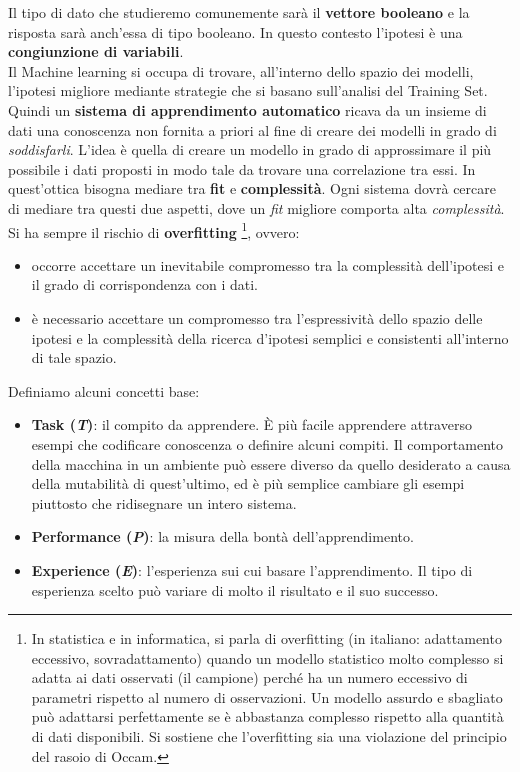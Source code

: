 Il tipo di dato che studieremo comunemente sarà il \textbf{vettore booleano} e la risposta sarà anch'essa di tipo booleano. In questo contesto l'ipotesi è una \textbf{congiunzione di variabili}.\\
Il Machine learning si occupa di trovare, all'interno dello spazio dei modelli, l'ipotesi migliore mediante strategie che si basano sull'analisi del Training Set.
Quindi un \textbf{sistema di apprendimento automatico} ricava da un insieme di dati
una conoscenza non fornita a priori al fine di creare dei modelli in grado di \textit{soddisfarli}. 
L'idea è quella di creare un modello in grado di approssimare il più possibile i dati proposti 
in modo tale da trovare una correlazione tra essi. In
quest'ottica bisogna mediare tra \textbf{fit} e \textbf{complessità}. Ogni
sistema dovrà cercare di mediare tra questi due aspetti, dove un \textit{fit}
migliore comporta alta \textit{complessità}. Si ha sempre il rischio di \textbf{overfitting} 
\footnote{In statistica e in informatica, si parla di overfitting (in italiano: adattamento eccessivo, sovradattamento) quando un modello statistico molto complesso si adatta ai dati osservati (il campione) perché ha un numero eccessivo di parametri rispetto al numero di osservazioni.
Un modello assurdo e sbagliato può adattarsi perfettamente se è abbastanza complesso rispetto alla quantità di dati disponibili.
Si sostiene che l'overfitting sia una violazione del principio del rasoio di Occam.}, ovvero:
\begin{itemize}
    \item occorre accettare un inevitabile compromesso tra la complessità dell'ipotesi e il grado di corrispondenza con i dati.
    \item è necessario accettare un compromesso tra l'espressività dello spazio delle ipotesi e la complessità della ricerca d'ipotesi semplici e consistenti all'interno di tale spazio.
\end{itemize}
Definiamo alcuni concetti base:
\begin{itemize}
  \item \textbf{Task (\textit{T})}: il compito da apprendere. È più facile
  apprendere attraverso esempi che codificare conoscenza o definire alcuni
  compiti. Il comportamento della macchina in un ambiente può essere
  diverso da quello desiderato a causa della mutabilità di quest'ultimo, ed è più
  semplice cambiare gli esempi piuttosto che ridisegnare un intero sistema. 
  \item \textbf{Performance (\textit{P})}: la misura della bontà
  dell'apprendimento.
  \item \textbf{Experience (\textit{E})}: l'esperienza sui cui basare
  l'apprendimento. Il tipo di esperienza scelto può variare di molto il risultato e
  il suo successo.
\end{itemize}
